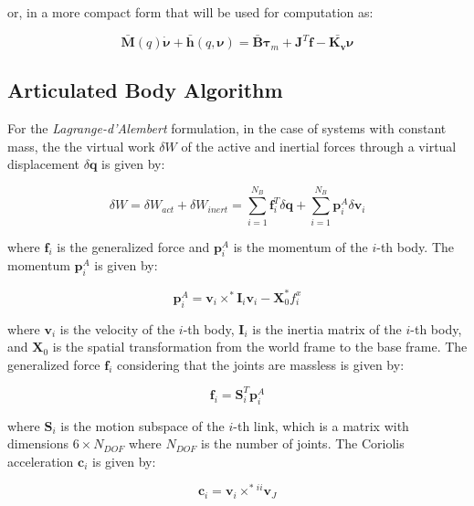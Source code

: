 or, in a more compact form that will be used for computation as:

\begin{equation}
    \mathbf{\bar{M}}(q)\dot{\boldsymbol{\nu}} + \mathbf{\bar{h}}(q,\boldsymbol{\nu}) = \mathbf{\bar{B}}\boldsymbol{\tau} _m + \mathbf{J} ^T \mathbf{f} - \bar{\mathbf{K _v}}\boldsymbol{\nu}
\end{equation}

\subsection{Articulated Body Algorithm}

For the \textit{Lagrange-d'Alembert} formulation, in the case of systems with constant mass, the the virtual work $\delta W$ of the active and inertial forces through a virtual displacement $\delta \mathbf{q}$ is given by:

\begin{equation}
    \delta W = \delta W _{act} + \delta W _{inert} = \sum _{i = 1} ^{N _B} \mathbf{f} _i ^T \delta \mathbf{q} + \sum _{i = 1} ^{N _B} \mathbf{p} ^A _i \delta \mathbf{v} _i
\end{equation}

where $\mathbf{f} _i$ is the generalized force and $\mathbf{p} ^A _i$ is the momentum of the $i$-th body. The momentum $\mathbf{p} ^A _i$ is given by:

\begin{equation}
    \mathbf{p} ^A _i = \mathbf{v} _i \times ^* \mathbf{I} _i \mathbf{v} _i - \mathbf{X} ^* _0 f ^x _i
\end{equation}

where $\mathbf{v} _i$ is the velocity of the $i$-th body, $\mathbf{I} _i$ is the inertia matrix of the $i$-th body, and $\mathbf{X} _0$ is the spatial transformation from the world frame to the base frame. The generalized force $\mathbf{f} _i$ considering that the joints are massless is given by:

\begin{equation}
    \mathbf{f} _i = \mathbf{S} ^T _i \mathbf{p} ^A _i
\end{equation}

where $\mathbf{S} _i$ is the motion subspace of the $i$-th link, which is a matrix with dimensions $6 \times N _{DOF}$ where $N _{DOF}$ is the number of joints. The Coriolis acceleration $\mathbf{c} _i$ is given by:

\begin{equation}
    \mathbf{c} _i = \mathbf{v} _i \times ^* {} ^{ii}\mathbf{v} _J
\end{equation}

